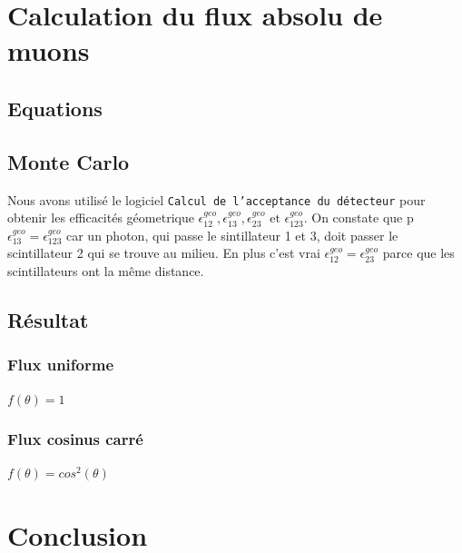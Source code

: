 \documentclass[a4paper,11pt,liststotocnumbered,bibtotocnumbered]{scrartcl}
\begin{document}
 \section{Calculation du flux absolu de muons}
  \subsection{Equations}
  
  \subsection{Monte Carlo}
   Nous avons utilisé le logiciel \texttt{Calcul de l'acceptance du détecteur} pour obtenir les efficacités géometrique $\epsilon_{12}^{geo},\epsilon_{13}^{geo}, \epsilon_{23}^{geo}\text{ et }\epsilon_{123}^{geo}$. On constate que p$\epsilon_{13}^{geo}=\epsilon_{123}^{geo}$ car un photon, qui passe le sintillateur 1 et 3, doit passer le scintillateur 2 qui se trouve au milieu. En plus c'est vrai $\epsilon_{12}^{geo}=\epsilon_{23}^{geo}$ parce que les scintillateurs ont la même distance.
 
  \subsection{Résultat}
   \subsubsection{Flux uniforme}
    $f(\theta)=1$

   \subsubsection{Flux cosinus carré}
    $f(\theta)=cos^2(\theta)$
  
 


 \section{Conclusion}


 \begin{appendix}
  
    

  \listoffigures  
 \end{appendix}
\end{document}
